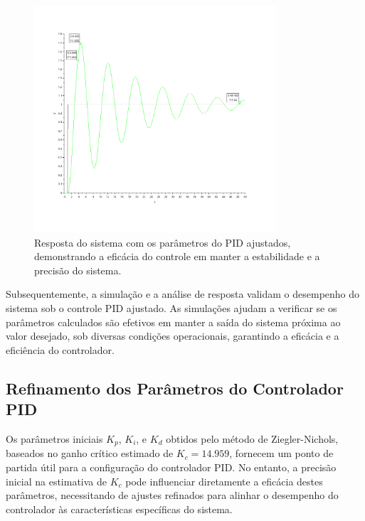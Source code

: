 \begin{figure}[H]
    \centering
    \includegraphics[width=0.8\textwidth]{6-atividade/assets/pid-implementado-com-valores-iniciais.png}
    \caption{Resposta do sistema com os parâmetros do PID ajustados, demonstrando a eficácia do controle em manter a estabilidade e a precisão do sistema.}
    \label{fig:resposta-pid}
\end{figure}

Subsequentemente, a simulação e a análise de resposta validam o desempenho do sistema sob o controle PID ajustado. As simulações ajudam a verificar se os parâmetros calculados são efetivos em manter a saída do sistema próxima ao valor desejado, sob diversas condições operacionais, garantindo a eficácia e a eficiência do controlador.

\subsection{Refinamento dos Parâmetros do Controlador PID}
Os parâmetros iniciais \( K_p \), \( K_i \), e \( K_d \) obtidos pelo método de Ziegler-Nichols, baseados no ganho crítico estimado de \( K_c = 14.959 \), fornecem um ponto de partida útil para a configuração do controlador PID. No entanto, a precisão inicial na estimativa de \( K_c \) pode influenciar diretamente a eficácia destes parâmetros, necessitando de ajustes refinados para alinhar o desempenho do controlador às características específicas do sistema.

